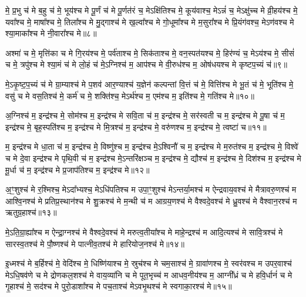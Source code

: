 मे॒ प्र॒भु च॑ मे ब॒हु च॑ मे॒ भूय॑श्च मे पू॒र्णं च॑ मे पू॒र्णत॑रं च॒ मे\-ऽक्षि॑तिश्च मे॒ कूय॑वाश्च॒ मे\-ऽन्नं॑ च॒ मे\-ऽक्षु॑च्च मे व्री॒हय॑श्च मे॒ यवा᳚श्च मे॒ माषा᳚श्च मे॒ तिला᳚श्च मे मु॒द्गाश्च॑ मे ख॒ल्वा᳚श्च मे गो॒धूमा᳚श्च मे म॒सुरा᳚श्च मे प्रि॒यंग॑वश्च॒ मे\-ऽण॑वश्च मे श्या॒माका᳚श्च मे नी॒वारा᳚श्च मे॥८॥

{\anuvakamend[{वि॒भु च॑ म॒सुरा॒श्चतु॑र्दश च॥४॥}]}

अश्मा॑ च मे॒ मृत्ति॑का च मे गि॒रय॑श्च मे॒ पर्व॑ताश्च मे॒ सिक॑ताश्च मे॒ वन॒स्पत॑यश्च मे॒ हिर॑ण्यं च॒ मे\-ऽय॑श्च मे॒ सीसं॑ च मे॒ त्रपु॑श्च मे श्या॒मं च॑ मे लो॒हं च॑ मे॒\-ऽग्निश्च॑ म॒ आप॑श्च मे वी॒रुध॑श्च म॒ ओष॑धयश्च मे कृष्टप॒च्यं च॑॥९॥

मे॒\-ऽकृ॒ष्ट॒प॒च्यं च॑ मे ग्रा॒म्याश्च॑ मे प॒शव॑ आर॒ण्याश्च॑ य॒ज्ञेन॑ कल्पन्तां वि॒त्तं च॑ मे॒ वित्ति॑श्च मे भू॒तं च॑ मे॒ भूति॑श्च मे॒ वसु॑ च मे वस॒तिश्च॑ मे॒ कर्म॑ च मे॒ शक्ति॑श्च॒ मे\-ऽर्थ॑श्च म॒ एम॑श्च म॒ इति॑श्च मे॒ गति॑श्च मे॥१०॥

{\anuvakamend[{कृ॒ष्ट॒प॒च्यञ्चा॒ष्टाच॑त्वारिꣳशच्च॥५॥}]}

अ॒ग्निश्च॑ म॒ इन्द्र॑श्च मे॒ सोम॑श्च म॒ इन्द्र॑श्च मे सवि॒ता च॑ म॒ इन्द्र॑श्च मे॒ सर॑स्वती च म॒ इन्द्र॑श्च मे पू॒षा च॑ म॒ इन्द्र॑श्च मे॒ बृह॒स्पति॑श्च म॒ इन्द्र॑श्च मे मि॒त्रश्च॑ म॒ इन्द्र॑श्च मे॒ वरु॑णश्च म॒ इन्द्र॑श्च मे॒ त्वष्टा॑ च॥११॥

म॒ इन्द्र॑श्च मे धा॒ता च॑ म॒ इन्द्र॑श्च मे॒ विष्णु॑श्च म॒ इन्द्र॑श्च मे॒\-ऽश्विनौ॑ च म॒ इन्द्र॑श्च मे म॒रुत॑श्च म॒ इन्द्र॑श्च मे॒ विश्वे॑ च मे दे॒वा इन्द्र॑श्च मे पृथि॒वी च॑ म॒ इन्द्र॑श्च मे॒\-ऽन्तरि॑क्षञ्च म॒ इन्द्र॑श्च मे॒ द्यौश्च॑ म॒ इन्द्र॑श्च मे॒ दिश॑श्च म॒ इन्द्र॑श्च मे मू॒र्धा च॑ म॒ इन्द्र॑श्च मे प्र॒जाप॑तिश्च म॒ इन्द्र॑श्च मे॥१२॥

{\anuvakamend[{त्वष्टा॑ च॒ द्यौश्च॑ म॒ एक॑विꣳशतिश्च॥६॥}]}

अ॒ꣳ॒शुश्च॑ मे र॒श्मिश्च॒ मे\-ऽदा᳚भ्यश्च॒ मे\-ऽधि॑पतिश्च म उपा॒ꣳ॒शुश्च॑ मे\-ऽन्तर्या॒मश्च॑ म ऐन्द्रवाय॒वश्च॑ मे मैत्रावरु॒णश्च॑ म आश्वि॒नश्च॑ मे प्रतिप्र॒स्थान॑श्च मे शु॒क्रश्च॑ मे म॒न्थी च॑ म आग्रय॒णश्च॑ मे वैश्वदे॒वश्च॑ मे ध्रु॒वश्च॑ मे वैश्वान॒रश्च॑ म ऋतुग्र॒हाश्च॑॥१३॥

मे॒\-ऽति॒ग्रा॒ह्या᳚श्च म ऐन्द्रा॒ग्नश्च॑ मे वैश्वदे॒वश्च॑ मे मरुत्व॒तीया᳚श्च मे माहे॒न्द्रश्च॑ म आदि॒त्यश्च॑ मे सावि॒त्रश्च॑ मे सारस्व॒तश्च॑ मे पौ॒ष्णश्च॑ मे पात्नीव॒तश्च॑ मे हारियोज॒नश्च॑ मे॥१४॥

{\anuvakamend[{ऋ॒तु॒ग्र॒हाश्च॒ चतु॑स्त्रिꣳशच्च॥७॥}]}

इ॒ध्मश्च॑ मे ब॒र्\mbox{}हिश्च॑ मे॒ वेदि॑श्च मे॒ धिष्णि॑याश्च मे॒ स्रुच॑श्च मे चम॒साश्च॑ मे॒ ग्रावा॑णश्च मे॒ स्वर॑वश्च म उपर॒वाश्च॑ मे\-ऽधि॒षव॑णे च मे द्रोणकल॒शश्च॑ मे वाय॒व्या॑नि च मे पूत॒भृच्च॑ म आधव॒नीय॑श्च म॒ आग्नी᳚ध्रं च मे हवि॒र्धानं॑ च मे गृ॒हाश्च॑ मे॒ सद॑श्च मे पुरो॒डाशा᳚श्च मे पच॒ताश्च॑ मे\-ऽवभृ॒थश्च॑ मे स्वगाका॒रश्च॑ मे॥१५॥


